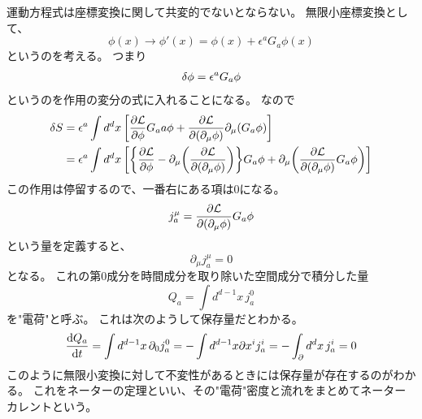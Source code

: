 \documentclass[../../master.tex]{subfiles}
\begin{document}
運動方程式は座標変換に関して共変的でないとならない。
無限小座標変換として、
\begin{equation}
    \phi(x) \rightarrow \phi'(x) = \phi(x) + \epsilon^a G_a \phi(x)
\end{equation}
というのを考える。
つまり
\begin{align*}
    \var{\phi}=\epsilon^a G_a \phi
\end{align*}
というのを作用の変分の式に入れることになる。
なので
\begin{align}
    \var{S}
    &= \epsilon^a \int d^d x\, \qty[\pdv{\mathcal{L}}{\phi}G_aa\phi+\pdv{\mathcal{L}}{(\partial_\mu \phi)}\partial_\mu (G_a\phi)] \notag\\
    &= \epsilon^a  \int d^d x\, \qty[
            \qty{\pdv{\mathcal{L}}{\phi}
            -\partial_\mu\qty(\pdv{\mathcal{L}}{(\partial_\mu \phi)})}G_a\phi
            +\partial_\mu\qty(\pdv{\mathcal{L}}{(\partial_\mu\phi)}G_a \phi)
        ]
\end{align}
この作用は停留するので、一番右にある項は0になる。
\begin{equation}
    j_a^\mu=\pdv{\mathcal{L}}{(\partial_\mu\phi)}G_a\phi
\end{equation}
という量を定義すると、
\begin{equation}
    \partial_\mu j_a^\mu =0
\end{equation}
となる。
これの第0成分を時間成分を取り除いた空間成分で積分した量
\begin{equation}
    Q_a = \int d^{d-1}x \,j_a^0
\end{equation}
を"電荷"と呼ぶ。
これは次のようして保存量だとわかる。
\begin{equation}
    \dv{Q_a}{t} = \int d^{d-1}x\, \partial_{0}j_a^0 = -\int d^{d-1}x \partial{x^i}j_a^i = -\int_\partial d^dx\,j_a^i =0
\end{equation}
このように無限小変換に対して不変性があるときには保存量が存在するのがわかる。
これをネーターの定理といい、その"電荷"密度と流れをまとめてネーターカレントという。

\end{document}
